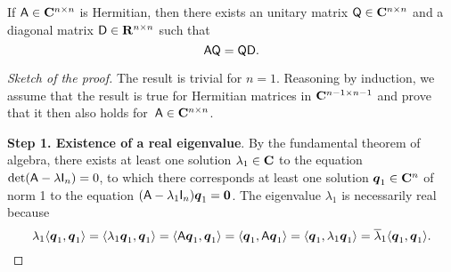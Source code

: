 \begin{theorem}
    \label{theorem:spectral_theorem}
    If $\mathsf A \in \mathbf C^{n \times n}$ is Hermitian,
    then there exists an unitary matrix $\mathsf Q \in \mathbf C^{n \times n}$ and a diagonal matrix $\mathsf D \in \mathbf R^{n \times n}$ such that
    \[
        \mathsf A \mathsf Q = \mathsf Q \mathsf D.
    \]
\end{theorem}
\begin{proof}
    [Sketch of the proof]
    The result is trivial for $n = 1$.
    Reasoning by induction,
    we assume that the result is true for Hermitian matrices in $\mathbf C^{n-1 \times n-1}$
    and prove that it then also holds for~$\mathsf A \in \mathbf C^{n \times n}$.

        \vspace{.3cm}
        \textbf{Step 1. Existence of a real eigenvalue}.
        By the fundamental theorem of algebra,
        there exists at least one solution $\lambda_1 \in \mathbf C$ to the equation $\det(\mathsf A - \lambda \mathsf I_n) = 0$,
        to which there corresponds at least one solution $\mathbf{\boldsymbol{q}}_1 \in \mathbf C^n$ of norm 1 to the equation $(\mathsf A - \lambda_1 \mathsf I_n) \mathbf{\boldsymbol{q}}_{1} = \mathbf{\boldsymbol{0}}$.
        The eigenvalue $\lambda_1$ is necessarily real because
        \[
            \lambda_1 \langle\mathbf{\boldsymbol{q}}_1, \mathbf{\boldsymbol{q}}_1\rangle
            = \langle\lambda_1 \mathbf{\boldsymbol{q}}_1, \mathbf{\boldsymbol{q}}_1\rangle
            = \langle\mathsf A \mathbf{\boldsymbol{q}}_1, \mathbf{\boldsymbol{q}}_1\rangle
            = \langle\mathbf{\boldsymbol{q}}_1, \mathsf A\mathbf{\boldsymbol{q}}_1\rangle
            = \langle\mathbf{\boldsymbol{q}}_1, \lambda_1 \mathbf{\boldsymbol{q}}_1\rangle
            = \overline \lambda_1 \langle\mathbf{\boldsymbol{q}}_1, \mathbf{\boldsymbol{q}}_1\rangle.
        \]


\end{proof}
